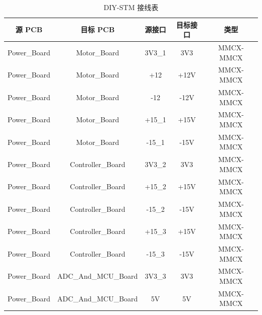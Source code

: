 \documentclass[12pt]{ctexart}
\begin{document}
\begin{table}[!h]
    \small
    \caption{DIY-STM 接线表}
    \centering
    \begin{tabular}{ccccc}
        \toprule[1.5pt]
        \textbf{\quad 源 PCB\quad}        & \textbf{\quad 目标 PCB\quad}      & \textbf{\quad 源接口\quad} & \textbf{\; 目标接口\;} & \textbf{\quad 类型\quad}   \\
        \midrule[0.8pt]
        Power\_Board                     & Motor\_Board                    & 3V3\_1                  & 3V3                & MMCX-MMCX                \\
        Power\_Board                     & Motor\_Board                    & +12                     & +12V               & MMCX-MMCX                \\
        Power\_Board                     & Motor\_Board                    & -12                     & -12V               & MMCX-MMCX                \\
        Power\_Board                     & Motor\_Board                    & +15\_1                  & +15V               & MMCX-MMCX                \\
        Power\_Board                     & Motor\_Board                    & -15\_1                  & -15V               & MMCX-MMCX                \\
        \midrule[0.1pt]
        Power\_Board                     & Controller\_Board               & 3V3\_2                  & 3V3                & MMCX-MMCX                \\
        Power\_Board                     & Controller\_Board               & +15\_2                  & +15V               & MMCX-MMCX                \\
        Power\_Board                     & Controller\_Board               & -15\_2                  & -15V               & MMCX-MMCX                \\
        Power\_Board                     & Controller\_Board               & +15\_3                  & +15V               & MMCX-MMCX                \\
        Power\_Board                     & Controller\_Board               & -15\_3                  & -15V               & MMCX-MMCX                \\
        \midrule[0.1pt]
        Power\_Board                     & ADC\_And\_MCU\_Board            & 3V3\_3                  & 3V3                & MMCX-MMCX                \\
        Power\_Board                     & ADC\_And\_MCU\_Board            & 5V                      & 5V                 & MMCX-MMCX                \\

\end{tabular}
\end{table}
\end{document}

